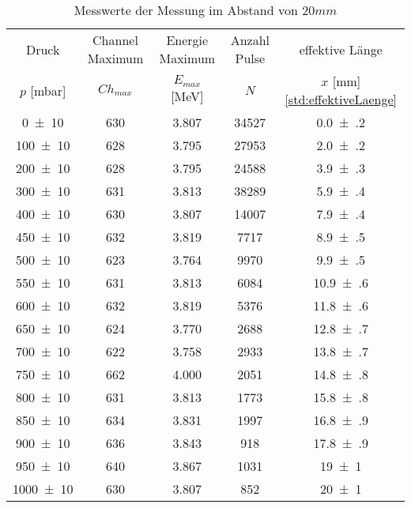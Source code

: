 \begin{table}[!h]
	\centering
	\begin{tabular}{|c|c|c|c|c|}
		\hline
		Druck & Channel Maximum & Energie Maximum & Anzahl Pulse& effektive Länge\\
		$p$ [\si{\milli\bar}] & $Ch_{max}$ & $E_{max}$ [\si{\mega\eV}] & $N$ & $x$ [\si{\milli\meter}] \cref{std:effektiveLaenge} \\
\hline\hline
		\num{0(10)} & \num{630} & \num{3.807} & \num{34527}& \num{0.0(2)}\\
		\num{100(10)} & \num{628} & \num{3.795} & \num{27953}& \num{2.0(2)}\\
		\num{200(10)} & \num{628} & \num{3.795} & \num{24588}& \num{3.9(3)}\\
		\num{300(10)} & \num{631} & \num{3.813} & \num{38289}& \num{5.9(4)}\\
		\num{400(10)} & \num{630} & \num{3.807} & \num{14007}& \num{7.9(4)}\\
		\num{450(10)} & \num{632} & \num{3.819} & \num{7717}& \num{8.9(5)}\\
		\num{500(10)} & \num{623} & \num{3.764} & \num{9970}& \num{9.9(5)}\\
		\num{550(10)} & \num{631} & \num{3.813} & \num{6084}& \num{10.9(6)}\\
		\num{600(10)} & \num{632} & \num{3.819} & \num{5376}& \num{11.8(6)}\\
		\num{650(10)} & \num{624} & \num{3.770} & \num{2688}& \num{12.8(7)}\\
		\num{700(10)} & \num{622} & \num{3.758} & \num{2933}& \num{13.8(7)}\\
		\num{750(10)} & \num{662} & \num{4.000} & \num{2051}& \num{14.8(8)}\\
		\num{800(10)} & \num{631} & \num{3.813} & \num{1773}& \num{15.8(8)}\\
		\num{850(10)} & \num{634} & \num{3.831} & \num{1997}& \num{16.8(9)}\\
		\num{900(10)} & \num{636} & \num{3.843} & \num{918}& \num{17.8(9)}\\
		\num{950(10)} & \num{640} & \num{3.867} & \num{1031}& \num{19(1)}\\
		\num{1000(10)} & \num{630} & \num{3.807} & \num{852}& \num{20(1)}\\
		\hline
	\end{tabular}
	\caption{Messwerte der Messung im Abstand von $20 \si{mm}$ \label{tab:Messwerte_I}}
\end{table}

